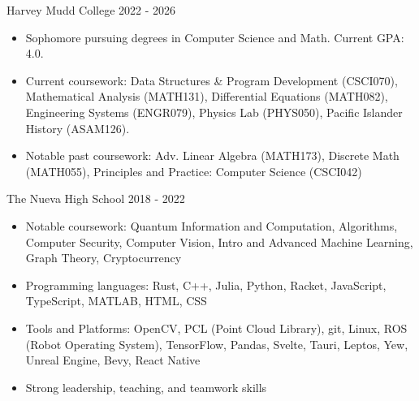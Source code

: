 \documentclass[9pt]{resume}
\begin{document}
    \begin{experiencelist}
        \experiencenocompany 
            {Harvey Mudd College}
            {2022 - 2026}
            {\begin{itemize}[noitemsep, topsep=1pt]
                \item {Sophomore pursuing degrees in Computer Science and Math. Current GPA: 4.0. }
                \item {Current coursework: Data Structures \& Program Development (CSCI070), Mathematical Analysis (MATH131), Differential Equations (MATH082), Engineering Systems (ENGR079), Physics Lab (PHYS050), Pacific Islander History (ASAM126).}
                \item {Notable past coursework: Adv. Linear Algebra (MATH173), Discrete Math (MATH055), Principles and Practice: Computer Science (CSCI042)}
            \end{itemize}}
        \experiencenocompany
            {The Nueva High School}
            {2018 - 2022}
            {\begin{itemize}[noitemsep, topsep=1pt]
                \item Notable coursework: Quantum Information and Computation, Algorithms, Computer Security, Computer Vision, Intro and Advanced Machine Learning, Graph Theory, Cryptocurrency
            \end{itemize}}
    \end{experiencelist}
    \vspace{-0.4cm}
    \begin{itemize}[noitemsep, topsep=0pt]
        \item Programming languages: Rust, C++, Julia, Python, Racket, JavaScript, TypeScript, MATLAB, HTML, CSS
        \item Tools and Platforms: OpenCV, PCL (Point Cloud Library), git, Linux, ROS (Robot Operating System), TensorFlow, Pandas, Svelte, Tauri, Leptos, Yew, Unreal Engine, Bevy, React Native
        \item Strong leadership, teaching, and teamwork skills
    \end{itemize}
    \vspace{0.4cm}
        
\end{document}
